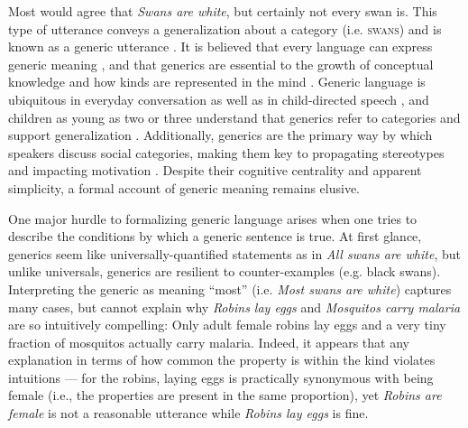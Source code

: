 \documentclass[10pt,letterpaper]{article}
\begin{document}
Most would agree that \emph{Swans are white}, but certainly not every swan is.
This type of utterance conveys a generalization about a category (i.e. \textsc{swans}) and is known as a generic utterance \cite{Carlson1977, Leslie2008}.
It is believed that every language can express generic meaning \cite{Behrens2005, Carlson1995}, and that generics are essential to the growth of conceptual knowledge \cite{Gelman2004} and how kinds are represented in the mind \cite{Leslie2008}.
Generic language is ubiquitous in everyday conversation as well as in child-directed speech \cite{Gelman2008}, and children as young as two or three understand that generics refer to categories and support generalization \cite{Cimpian2008}.
Additionally, generics are the primary way by which speakers discuss social categories, making them key to propagating stereotypes \cite{GelmanEtAl2004, Rhodes2012, Leslie2015} and impacting motivation \cite{Cimpian2010motivation}.
Despite their cognitive centrality and apparent simplicity, a formal account of generic meaning remains elusive.

One major hurdle to formalizing generic language arises when one tries to describe the conditions by which a generic sentence is true.
At first glance, generics seem like universally-quantified statements as in \emph{All swans are white}, but unlike universals, generics are resilient to counter-examples (e.g. black swans). 
Interpreting the generic as meaning ``most'' (i.e. \emph{Most swans are white}) captures many cases, but cannot explain why \emph{Robins lay eggs} and \emph{Mosquitos carry malaria} are so intuitively compelling: Only adult female robins lay eggs and a very tiny fraction of mosquitos actually carry malaria.
Indeed, it appears that any explanation in terms of how common the property is within the kind violates intuitions --- for the robins, laying eggs is practically synonymous with being female (i.e., the properties are present in the same proportion), yet \emph{Robins are female} is not a reasonable utterance while \emph{Robins lay eggs} is fine.
\end{document}
